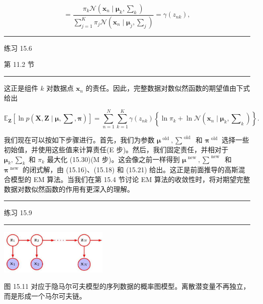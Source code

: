 \documentclass[10pt]{article}
\newcommand{\HRule}{\begin{center}\rule{0.9\linewidth}{0.2mm}\end{center}}
\begin{document}
\[
= \frac{{\pi }_{k}\mathcal{N}\left( {{\mathbf{x}}_{n} \mid  {\mathbf{\mu }}_{k},{\mathbf{\sum }}_{k}}\right) }{\mathop{\sum }\limits_{{j = 1}}^{K}{\pi }_{j}\mathcal{N}\left( {{\mathbf{x}}_{n} \mid  {\mathbf{\mu }}_{j},{\mathbf{\sum }}_{j}}\right) } = \gamma \left( {z}_{nk}\right) , \tag{15.29}
\]

\HRule

练习 15.6

第 11.2 节

\HRule

这正是组件 \(k\) 对数据点 \({\mathbf{x}}_{n}\) 的责任。因此，完整数据对数似然函数的期望值由下式给出

\[
{\mathbb{E}}_{\mathbf{Z}}\left\lbrack  {\ln p\left( {\mathbf{X},\mathbf{Z} \mid  \mathbf{\mu },\mathbf{\sum },\mathbf{\pi }}\right) }\right\rbrack   = \mathop{\sum }\limits_{{n = 1}}^{N}\mathop{\sum }\limits_{{k = 1}}^{K}\gamma \left( {z}_{nk}\right) \left\{  {\ln {\pi }_{k} + \ln \mathcal{N}\left( {{\mathbf{x}}_{n} \mid  {\mathbf{\mu }}_{k},{\mathbf{\sum }}_{k}}\right) }\right\}  . \tag{15.30}
\]

我们现在可以按如下步骤进行。首先，我们为参数 \({\mathbf{\mu }}^{\text{ old }},{\mathbf{\sum }}^{\text{ old }}\) 和 \({\mathbf{\pi }}^{\text{ old }}\) 选择一些初始值，并使用这些值来计算责任(E 步)。然后，我们固定责任，并相对于 \({\mathbf{\mu }}_{k},{\mathbf{\sum }}_{k}\) 和 \({\pi }_{k}\) 最大化 (15.30)(M 步)。这会像之前一样得到 \({\mathbf{\mu }}^{\text{ new }},{\mathbf{\sum }}^{\text{ new }}\) 和 \({\mathbf{\pi }}^{\text{ new }}\) 的闭式解，由 (15.16)、(15.18) 和 (15.21) 给出。这正是前面推导的高斯混合模型的 EM 算法。当我们在第 15.4 节讨论 EM 算法的收敛性时，将对期望完整数据对数似然函数的作用有更深入的理解。

\HRule

练习 15.9

\HRule

\begin{center}
\includegraphics[max width=0.4\textwidth]{images/0194e279-9b28-703a-88f4-c3ac21e2010d_499_1013_344_535_222_0.jpg}
\end{center}
\hspace*{3em} 

图 15.11 对应于隐马尔可夫模型的序列数据的概率图模型。离散潜变量不再独立，而是形成一个马尔可夫链。
\end{document}
